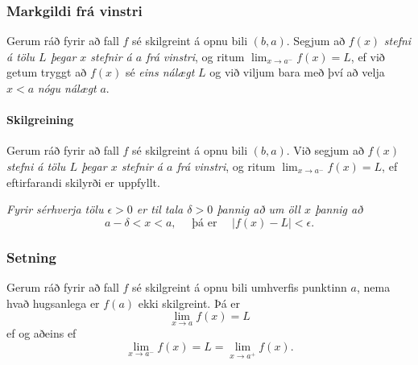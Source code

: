 \documentclass[icelandic,a4paper,12pt]{article}
\begin{document}
\subsubsection*{Markgildi frá vinstri}
Gerum ráð fyrir að fall $f$ sé
skilgreint á opnu bili $(b,a)$.  Segjum að  $f(x)$
{\it stefni á tölu $L$ þegar $x$ stefnir á $a$ frá vinstri}, og ritum
$\lim_{x\rightarrow a^-} f(x)=L$, ef við getum tryggt að  $f(x)$ sé 
{\em eins nálægt}
$L$ og við viljum bara með því að velja $x<a$ {\em nógu nálægt} $a$. 


\pause

\paragraph{Skilgreining} Gerum ráð fyrir að fall $f$ sé
skilgreint á opnu bili $(b,a)$.  Við segjum að $f(x)$
{\it stefni á tölu $L$ þegar $x$ stefnir á $a$ frá vinstri}, og ritum
$\lim_{x\rightarrow a^-} f(x)=L$, ef eftirfarandi skilyrði er uppfyllt.

{\it Fyrir sérhverja tölu $\epsilon>0$ er til tala $\delta>0$ þannig
  að um öll $x$ þannig að} 
$$
a-\delta<x<a,\quad \text{ þá er } \quad |f(x)-L|<\epsilon.
$$



\subsubsection*{Setning} Gerum ráð fyrir að fall $f$ sé
skilgreint á opnu bili umhverfis punktinn $a$, nema hvað hugsanlega er
$f(a)$ ekki skilgreint.  Þá er 
$$\lim_{x\rightarrow a} f(x)=L$$
ef og aðeins ef 
$$\lim_{x\rightarrow a^-} f(x)=L=\lim_{x\rightarrow a^+} f(x).$$




% 
% 
% 
% 
% 
% 
% 
% 
% 
\end{document}
